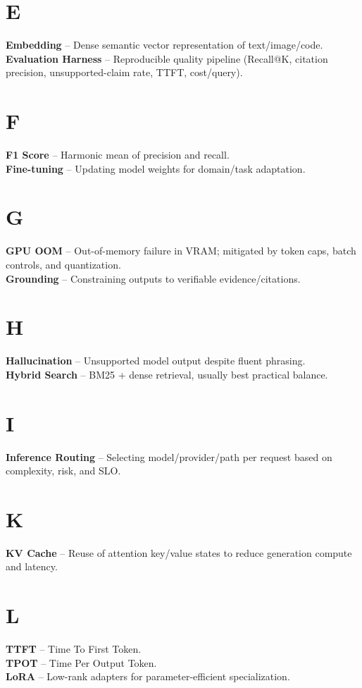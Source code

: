 \section*{E}
\textbf{Embedding} -- Dense semantic vector representation of text/image/code.\\
\textbf{Evaluation Harness} -- Reproducible quality pipeline (Recall@K, citation precision, unsupported-claim rate, TTFT, cost/query).

\section*{F}
\textbf{F1 Score} -- Harmonic mean of precision and recall.\\
\textbf{Fine-tuning} -- Updating model weights for domain/task adaptation.

\section*{G}
\textbf{GPU OOM} -- Out-of-memory failure in VRAM; mitigated by token caps, batch controls, and quantization.\\
\textbf{Grounding} -- Constraining outputs to verifiable evidence/citations.

\section*{H}
\textbf{Hallucination} -- Unsupported model output despite fluent phrasing.\\
\textbf{Hybrid Search} -- BM25 + dense retrieval, usually best practical balance.

\section*{I}
\textbf{Inference Routing} -- Selecting model/provider/path per request based on complexity, risk, and SLO.

\section*{K}
\textbf{KV Cache} -- Reuse of attention key/value states to reduce generation compute and latency.

\section*{L}
\textbf{TTFT} -- Time To First Token.\\
\textbf{TPOT} -- Time Per Output Token.\\
\textbf{LoRA} -- Low-rank adapters for parameter-efficient specialization.

